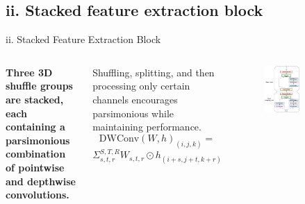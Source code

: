 \documentclass[aspectratio=169,xcolor=dvipsnames]{beamer}
\begin{document}
\subsection{ii. Stacked feature extraction block}
\begin{frame}{ii. Stacked Feature Extraction Block}
    \begin{columns}[c]
        \textbf{Three 3D shuffle groups are stacked, each containing a parsimonious
        combination of pointwise and depthwise convolutions.}
        
        Shuffling, splitting, and then processing only certain channels encourages parsimonious while maintaining performance.
        \newline
        \begin{equation*}
            \text{DWConv}(W, h)_{(i, j, k)} =
        \end{equation*}
        \begin{equation*}
            \Sigma_{s,t,r}^{S, T, R} W_{s,t,r}\odot h_{(i+s,j+t,k+r)}
        \end{equation*}
        \begin{figure}
            \includegraphics[width=0.55\textwidth]{images/network_right}
        \end{figure}
    \end{columns}
\end{frame}
\end{document}
